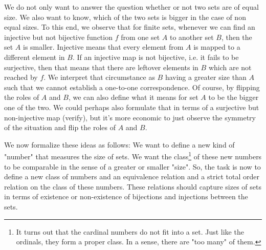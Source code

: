 

\medskip
We do not only want to answer the question whether or not two sets are of equal size. We also want to know, which of the two sets is bigger in the case of non equal sizes. To this end, we observe that for finite sets, whenever we can find an injective but not bijective function $f$ from one set $A$ to another set $B$, then the set $A$ is smaller. Injective means that every element from $A$ is mapped to a different element in $B$. If an injective map is not bijective, i.e. it fails to be surjective, then that means that there are leftover elements in $B$ which are not reached by $f$. We interpret that circumstance as $B$ having a greater size than $A$ such that we cannot establish a one-to-one correspondence. Of course, by flipping the roles of $A$ and $B$, we can also define what it means for set $A$ to be the bigger one of the two. We could perhaps also formulate that in terms of a surjective but non-injective map (verify), but it's more economic to just observe the symmetry of the situation and flip the roles of $A$ and $B$.

\medskip
We now formalize these ideas as follows: We want to define a new kind of "number" that measures the size of sets. We want the class\footnote{It turns out that the cardinal numbers do not fit into a set. Just like the ordinals, they form a proper class. In a sense, there are "too many" of them. } of these new numbers to be comparable in the sense of a greater or smaller "size". So, the task is now to define a new class of numbers and an equivalence relation and a strict total order relation on the class of these numbers. These relations should capture sizes of sets in terms of existence or non-existence of bijections and injections between the sets.

